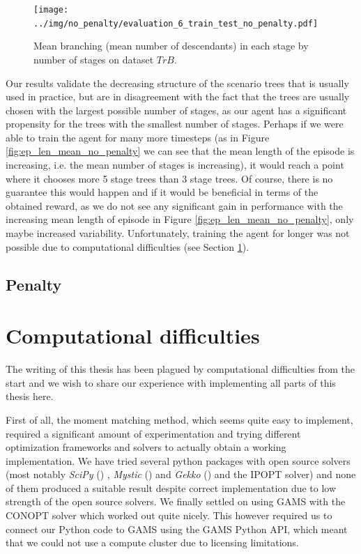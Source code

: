 \begin{figure}[H]
\centering
  \texttt{[image: ../img/no\_penalty/evaluation\_6\_train\_test\_no\_penalty.pdf]}
  \caption{Mean branching (mean number of descendants) in each stage by number of stages on dataset $TrB$.}
  \label{fig:mean_branching_no_penalty_trb}
\end{figure}

Our results validate the decreasing structure of the scenario trees that is usually used in practice, but are in disagreement with the fact that the trees are usually chosen with the largest possible number of stages, as our agent has a significant propensity for the trees with the smallest number of stages. Perhaps if we were able to train the agent for many more timesteps (as in Figure \ref{fig:ep_len_mean_no_penalty} we can see that the mean length of the episode is increasing, i.e. the mean number of stages is increasing), it would reach a point where it chooses more 5 stage trees than 3 stage trees. Of course, there is no guarantee this would happen and if it would be beneficial in terms of the obtained reward, as we do not see any significant gain in performance with the increasing mean length of episode in Figure \ref{fig:ep_len_mean_no_penalty}, only maybe increased variability. Unfortunately, training the agent for longer was not possible due to computational difficulties (see Section \ref{section:computational_difficulties}).

\subsection{Penalty}
\label{subsection:somepenalty}


\section{Computational difficulties}
\label{section:computational_difficulties}
The writing of this thesis has been plagued by computational difficulties from the start and we wish to share our experience with implementing all parts of this thesis here. 

First of all, the moment matching method, which seems quite easy to implement, required a significant amount of experimentation and trying different optimization frameworks and solvers to actually obtain a working implementation. We have tried several python packages with open source solvers (most notably \textit{SciPy} (\cite{scipy}) , \textit{Mystic} (\cite{mystic}) and \textit{Gekko} (\cite{gekko}) and the IPOPT solver) and none of them produced a suitable result despite correct implementation due to low strength of the open source solvers. We finally settled on using GAMS with the CONOPT solver which worked out quite nicely. This however required us to connect our Python code to GAMS using the GAMS Python API, which meant that we could not use a compute cluster due to licensing limitations. 

